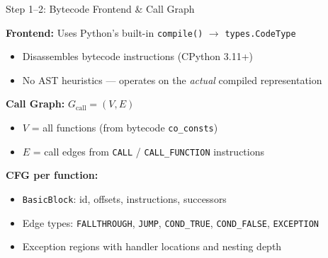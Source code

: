 \documentclass[aspectratio=169]{beamer}
\begin{document}
\begin{frame}[fragile]{Step 1--2: Bytecode Frontend \& Call Graph}

\textbf{Frontend:} Uses Python's built-in \texttt{compile()} $\to$ \texttt{types.CodeType}
\begin{itemize}
  \item Disassembles bytecode instructions (CPython 3.11+)
  \item No AST heuristics --- operates on the \emph{actual} compiled representation
\end{itemize}

\vspace{0.5em}
\textbf{Call Graph:} $G_{\text{call}} = (V, E)$
\begin{itemize}
  \item $V$ = all functions (from bytecode \texttt{co\_consts})
  \item $E$ = call edges from \texttt{CALL} / \texttt{CALL\_FUNCTION} instructions
\end{itemize}

\vspace{0.5em}
\textbf{CFG per function:}
\begin{itemize}
  \item \texttt{BasicBlock}: id, offsets, instructions, successors
  \item Edge types: \texttt{FALLTHROUGH}, \texttt{JUMP}, \texttt{COND\_TRUE}, \texttt{COND\_FALSE}, \texttt{EXCEPTION}
  \item Exception regions with handler locations and nesting depth
\end{itemize}

\end{frame}
\end{document}
